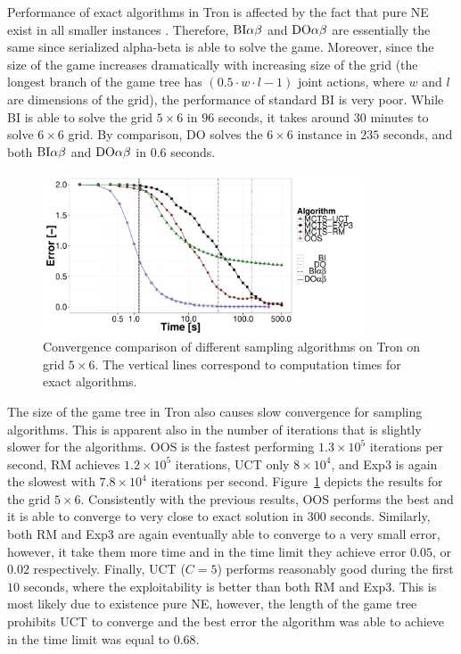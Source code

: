 Performance of exact algorithms in Tron is affected by the fact that pure NE exist in all smaller instances .
Therefore, $\textrm{BI}\alpha\beta$ and $\textrm{DO}\alpha\beta$ are essentially the same since serialized alpha-beta is able to solve the game.
Moreover, since the size of the game increases dramatically with increasing size of the grid (the longest branch of the game tree has $\left(0.5\cdot w\cdot l - 1\right)$ joint actions, where $w$ and $l$ are dimensions of the grid), the performance of standard BI is very poor.
While BI is able to solve the grid $5\times6$ in $96$ seconds, it takes around $30$ minutes to solve $6\times6$ grid.
By comparison, DO solves the $6\times6$ instance in $235$ seconds, and both $\textrm{BI}\alpha\beta$ and $\textrm{DO}\alpha\beta$ in $0.6$ seconds.

\begin{figure}[t]
\centering
\includegraphics[width=0.85\textwidth]{figures/convergence-tron.pdf}
\caption{Convergence comparison of different sampling algorithms on Tron on grid $5\times6$. The vertical lines correspond to computation times for exact algorithms.} \label{fig:off:conv:tron}
\end{figure}

The size of the game tree in Tron also causes slow convergence for sampling algorithms.
This is apparent also in the number of iterations that is slightly slower for the algorithms.
OOS is the fastest performing $1.3\times 10^5$ iterations per second, RM achieves $1.2\times 10^5$ iterations, UCT only $8\times10^4$, and Exp3 is again the slowest with $7.8\times10^4$ iterations per second.
Figure~\ref{fig:off:conv:tron} depicts the results for the grid $5\times6$.
Consistently with the previous results, OOS performs the best and it is able to converge to very close to exact solution in $300$ seconds.
Similarly, both RM and Exp3 are again eventually able to converge to a very small error, however, it take them more time and in the time limit they achieve error $0.05$, or $0.02$ respectively.
Finally, UCT ($C=5$) performs reasonably good during the first $10$ seconds, where the exploitability is better than both RM and Exp3.
This is most likely due to existence pure NE, however, the length of the game tree prohibits UCT to converge and the best error the algorithm was able to achieve in the time limit was equal to $0.68$.


